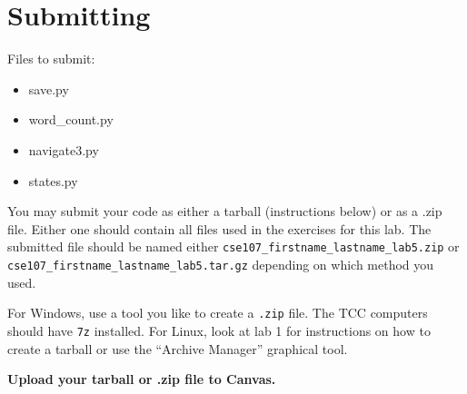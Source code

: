 \documentclass[11pt]{cselabheader}
\begin{document}
\pagebreak
\section{Submitting}

Files to submit:
\begin{itemize}
\item save.py
\item word\_count.py
\item navigate3.py
\item states.py
\end{itemize}

You may submit your code as either a tarball (instructions below) or as a .zip
file. Either one should contain all files used in the exercises for this lab.
The submitted file should be named either
\texttt{cse107\_firstname\_lastname\_lab5.zip} or
\texttt{cse107\_firstname\_lastname\_lab5.tar.gz} depending on which method you
used.

For Windows, use a tool you like to create a \texttt{.zip} file. The TCC
computers should have \texttt{7z} installed. For Linux, look at lab 1 for
instructions on how to create a tarball or use the ``Archive Manager'' graphical
tool.

\begin{center}
  \textbf{Upload your tarball or .zip file to Canvas.}
\end{center}
\end{document}
